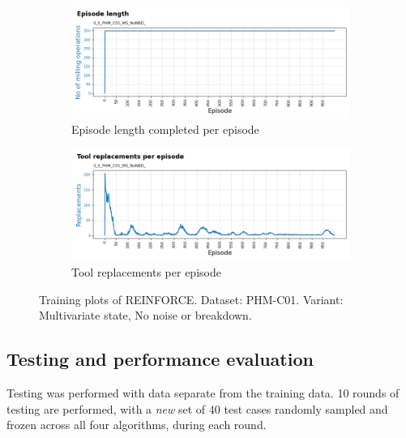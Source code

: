 \documentclass[a4paper, 12pt]{article}
\begin{document}
\begin{figure}[ht]
	\begin{subfigure}[b]{0.5\textwidth}
		\centering
		\includegraphics[width=\textwidth]{images/TrainingPlots/0_0_PHM_C01_MS_NoNBD__Episode_Length.png}  
		\caption{Episode length completed per episode}
		\label{fig:C01eplen}
	\end{subfigure}
	\hfill
	\begin{subfigure}[b]{0.5\textwidth}
		\centering
		\includegraphics[width=\textwidth]{images/TrainingPlots/0_0_PHM_C01_MS_NoNBD__Tool_Replacements.png}  
		\caption{Tool replacements per episode}
		\label{fig:C01toolrep}
	\end{subfigure} 
	\caption{Training plots of REINFORCE. Dataset: PHM-C01. Variant: Multivariate state, No noise or breakdown.}
	\label{fig:C01trplots}
\end{figure}

\subsection{Testing and performance evaluation}
Testing was performed with data separate from the training data. 10 rounds of testing are performed, with a \textit{new} set of 40 test cases randomly sampled and frozen across all four algorithms, during each round.
\end{document}
